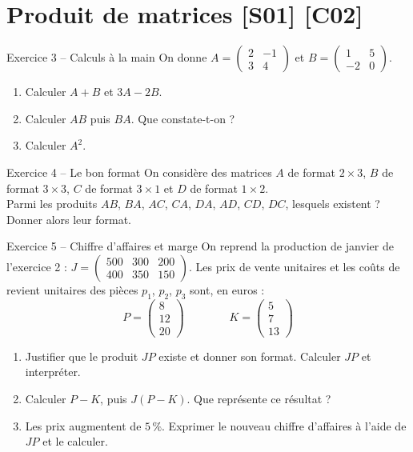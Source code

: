 \documentclass[a4paper,11pt]{article}
\newcommand{\M}[1]{\begin{pmatrix}#1\end{pmatrix}}
\begin{document}
\needspace{7cm}
\section{Produit de matrices \hfill {\normalsize\color{uimmred}[S01] [C02]}}

\begin{exo}{Exercice 3 -- Calculs à la main}
\label{exo:3}
On donne $A = \M{2 & -1\\ 3 & 4}$ et $B = \M{1 & 5\\ -2 & 0}$.
\begin{enumerate}[label=\alph*)]
  \item Calculer $A+B$ et $3A - 2B$.
  \item Calculer $AB$ puis $BA$. Que constate-t-on ?
  \item Calculer $A^2$.
\end{enumerate}
\end{exo}

\begin{exo}{Exercice 4 -- Le bon format}
\label{exo:4}
On considère des matrices $A$ de format $2\times 3$, $B$ de format $3\times 3$, $C$ de format $3\times 1$ et $D$ de format $1\times 2$.\\
Parmi les produits $AB$, $BA$, $AC$, $CA$, $DA$, $AD$, $CD$, $DC$, lesquels existent ? Donner alors leur format.
\end{exo}

\begin{exo}{Exercice 5 -- Chiffre d'affaires et marge}
\label{exo:5}
On reprend la production de janvier de l'exercice 2 : $J = \M{500 & 300 & 200\\ 400 & 350 & 150}$. Les prix de vente unitaires et les coûts de revient unitaires des pièces $p_1$, $p_2$, $p_3$ sont, en euros :
\[
P = \M{8\\12\\20} \qquad\qquad K = \M{5\\7\\13}
\]
\begin{enumerate}[label=\alph*)]
  \item Justifier que le produit $JP$ existe et donner son format. Calculer $JP$ et interpréter.
  \item Calculer $P - K$, puis $J(P-K)$. Que représente ce résultat ?
  \item Les prix augmentent de $5\,\%$. Exprimer le nouveau chiffre d'affaires à l'aide de $JP$ et le calculer.
\end{enumerate}
\end{exo}
\end{document}
